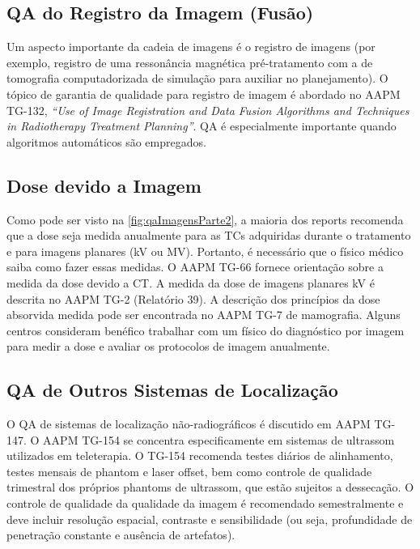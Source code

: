 \documentclass[11pt,a4paper]{article}
\newcounter{exemplo}
\begin{document}
\subsection*{QA do Registro da Imagem (Fusão)}

    Um aspecto importante da cadeia de imagens é o registro de imagens (por exemplo, registro de uma ressonância magnética pré-tratamento com a de tomografia computadorizada de simulação para auxiliar no planejamento). O tópico de garantia de qualidade para registro de imagem é abordado no AAPM TG-132, \textit{``Use of Image Registration and Data Fusion Algorithms and Techniques in Radiotherapy Treatment Planning''}. QA é especialmente importante quando algoritmos automáticos são empregados.

\subsection*{Dose devido a Imagem}

    Como pode ser visto na \ref{fig:qaImagensParte2}, a maioria dos reports recomenda que a dose seja medida anualmente para as TCs adquiridas durante o tratamento e para imagens planares (kV ou MV). Portanto, é necessário que o físico médico saiba como fazer essas medidas. O AAPM TG-66 fornece orientação sobre a medida da dose devido a CT. A medida da dose de imagens planares kV é descrita no AAPM TG-2 (Relatório 39). A descrição dos princípios da dose absorvida medida pode ser encontrada no AAPM TG-7 de mamografia. Alguns centros consideram benéfico trabalhar com um físico do diagnóstico por imagem para medir a dose e avaliar os protocolos de imagem anualmente.

\subsection*{QA de Outros Sistemas de Localização}

    O QA de sistemas de localização não-radiográficos é discutido em AAPM TG-147. O AAPM TG-154 se concentra especificamente em sistemas de ultrassom utilizados em teleterapia. O TG-154 recomenda testes diários de alinhamento, testes mensais de phantom e laser offset, bem como controle de qualidade trimestral dos próprios phantoms de ultrassom, que estão sujeitos a dessecação. O controle de qualidade da qualidade da imagem é recomendado semestralmente e deve incluir resolução espacial, contraste e sensibilidade (ou seja, profundidade de penetração constante e ausência de artefatos). 
    
\end{document}
